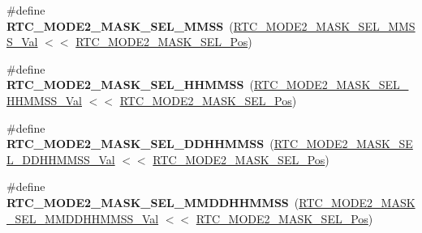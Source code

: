 \begin{DoxyCompactItemize}
\item 
\hypertarget{group___s_a_m_l21___r_t_c_ga360fb7098041daa78369580b0ba1cf7c}{}\#define {\bfseries R\+T\+C\+\_\+\+M\+O\+D\+E2\+\_\+\+M\+A\+S\+K\+\_\+\+S\+E\+L\+\_\+\+M\+M\+S\+S}~(\hyperlink{group___s_a_m_l21___r_t_c_ga03a70aab4146b9dc3c0d006a53ac8e49}{R\+T\+C\+\_\+\+M\+O\+D\+E2\+\_\+\+M\+A\+S\+K\+\_\+\+S\+E\+L\+\_\+\+M\+M\+S\+S\+\_\+\+Val}   $<$$<$ \hyperlink{group___s_a_m_l21___r_t_c_ga34aaed36d41b5e7dad831c960d609d15}{R\+T\+C\+\_\+\+M\+O\+D\+E2\+\_\+\+M\+A\+S\+K\+\_\+\+S\+E\+L\+\_\+\+Pos})\label{group___s_a_m_l21___r_t_c_ga360fb7098041daa78369580b0ba1cf7c}

\item 
\hypertarget{group___s_a_m_l21___r_t_c_ga46ee682cfe572b55b3c4f1eace06e8b3}{}\#define {\bfseries R\+T\+C\+\_\+\+M\+O\+D\+E2\+\_\+\+M\+A\+S\+K\+\_\+\+S\+E\+L\+\_\+\+H\+H\+M\+M\+S\+S}~(\hyperlink{group___s_a_m_l21___r_t_c_ga1532e3d7070bf4153a7bb52edfe551c0}{R\+T\+C\+\_\+\+M\+O\+D\+E2\+\_\+\+M\+A\+S\+K\+\_\+\+S\+E\+L\+\_\+\+H\+H\+M\+M\+S\+S\+\_\+\+Val} $<$$<$ \hyperlink{group___s_a_m_l21___r_t_c_ga34aaed36d41b5e7dad831c960d609d15}{R\+T\+C\+\_\+\+M\+O\+D\+E2\+\_\+\+M\+A\+S\+K\+\_\+\+S\+E\+L\+\_\+\+Pos})\label{group___s_a_m_l21___r_t_c_ga46ee682cfe572b55b3c4f1eace06e8b3}

\item 
\hypertarget{group___s_a_m_l21___r_t_c_ga73286f04f93a6b93496b59a796ddf5fe}{}\#define {\bfseries R\+T\+C\+\_\+\+M\+O\+D\+E2\+\_\+\+M\+A\+S\+K\+\_\+\+S\+E\+L\+\_\+\+D\+D\+H\+H\+M\+M\+S\+S}~(\hyperlink{group___s_a_m_l21___r_t_c_ga27f1ca1d54a34f2076fd1d03d2cee5bf}{R\+T\+C\+\_\+\+M\+O\+D\+E2\+\_\+\+M\+A\+S\+K\+\_\+\+S\+E\+L\+\_\+\+D\+D\+H\+H\+M\+M\+S\+S\+\_\+\+Val} $<$$<$ \hyperlink{group___s_a_m_l21___r_t_c_ga34aaed36d41b5e7dad831c960d609d15}{R\+T\+C\+\_\+\+M\+O\+D\+E2\+\_\+\+M\+A\+S\+K\+\_\+\+S\+E\+L\+\_\+\+Pos})\label{group___s_a_m_l21___r_t_c_ga73286f04f93a6b93496b59a796ddf5fe}

\item 
\hypertarget{group___s_a_m_l21___r_t_c_ga3cd3c5ebaf94ba8cfdb868929c884cbd}{}\#define {\bfseries R\+T\+C\+\_\+\+M\+O\+D\+E2\+\_\+\+M\+A\+S\+K\+\_\+\+S\+E\+L\+\_\+\+M\+M\+D\+D\+H\+H\+M\+M\+S\+S}~(\hyperlink{group___s_a_m_l21___r_t_c_ga87227ed0c01ed7e75c49d0b6bb6ff1e8}{R\+T\+C\+\_\+\+M\+O\+D\+E2\+\_\+\+M\+A\+S\+K\+\_\+\+S\+E\+L\+\_\+\+M\+M\+D\+D\+H\+H\+M\+M\+S\+S\+\_\+\+Val} $<$$<$ \hyperlink{group___s_a_m_l21___r_t_c_ga34aaed36d41b5e7dad831c960d609d15}{R\+T\+C\+\_\+\+M\+O\+D\+E2\+\_\+\+M\+A\+S\+K\+\_\+\+S\+E\+L\+\_\+\+Pos})\label{group___s_a_m_l21___r_t_c_ga3cd3c5ebaf94ba8cfdb868929c884cbd}


\end{DoxyCompactItemize}
